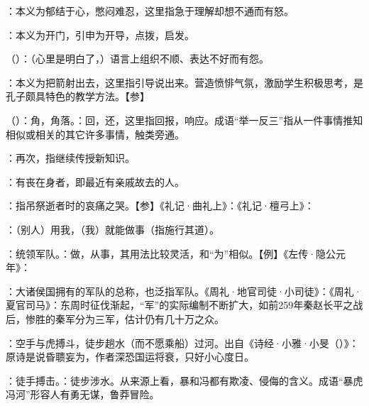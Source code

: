 {
\item {}：本义为郁结于心，憋闷难忍，这里指急于理解却想不通而有怒。

：本义为开门，引申为开导，点拨，启发。

\item {}（）：（心里是明白了，）语言上组织不顺、表达不好而有怨。

：本义为把箭射出去，这里指引导说出来。营造愤悱气氛，激励学生积极思考，是孔子颇具特色的教学方法。【参】

\item {}（）：角，角落。：回，还，这里指回报，响应。成语“举一反三”指从一件事情推知相似或相关的其它许多事情，触类旁通。
\item {}：再次，指继续传授新知识。
}
{}


{
\item {}：有丧在身者，即最近有亲戚故去的人。%
}
{}


{
\item {}：指吊祭逝者时的哀痛之哭。【参】《礼记·曲礼上》：《礼记·檀弓上》：
}
{}


{
\item {}：（别人）用我，（我）就能做事（指施行其道）。

\item {}：统领军队。：做，从事，其用法比较灵活，和“为”相似。【例】《左传·隐公元年》：

：大诸侯国拥有的军队的总称，也泛指军队。《周礼·地官司徒·小司徒》：《周礼·夏官司马》：东周时征伐渐起，“军”的实际编制不断扩大，如前259年秦赵长平之战后，惨胜的秦军分为三军，估计仍有几十万之众。 %

\item {}：空手与虎搏斗，徒步趟水（而不愿乘船）过河。出自《诗经·小雅·小旻（）》：原诗是说昏聩妄为，作者深恐国运将衰，只好小心度日。

：徒手搏击。：徒步涉水。从来源上看，暴和冯都有欺凌、侵侮的含义。成语“暴虎冯河”形容人有勇无谋，鲁莽冒险。
}
{}


